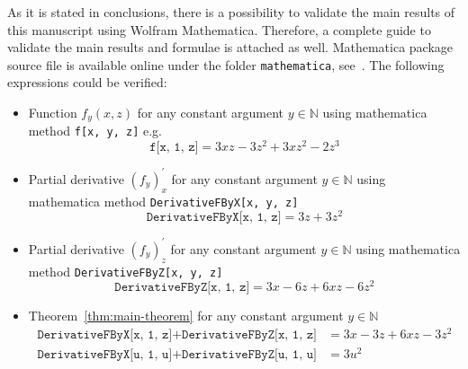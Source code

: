 As it is stated in conclusions, there is a possibility to validate the main results of this manuscript using
Wolfram Mathematica.
Therefore, a complete guide to validate the main results and formulae is attached as well.
Mathematica package source file is available online under the folder \texttt{mathematica}, see~\cite{kolosov2022another}.
The following expressions could be verified:
\begin{itemize}
    \item Function $f_y(x,z)$ for any constant argument $y\in\mathbb{N}$ using mathematica method \texttt{f[x, y, z]} e.g.
    \[
        \texttt{f[x, 1, z]} = 3 x z - 3 z^2 + 3 x z^2 - 2 z^3
    \]
    \item Partial derivative $(f_y)^{'}_x$ for any constant argument $y\in\mathbb{N}$ using mathematica
    method \texttt{DerivativeFByX[x, y, z]}
    \[
        \texttt{DerivativeFByX[x, 1, z]} = 3 z + 3 z^2
    \]
    \item Partial derivative $(f_y)^{'}_z$ for any constant argument $y\in\mathbb{N}$ using mathematica
    method \texttt{DerivativeFByZ[x, y, z]}
    \[
        \texttt{DerivativeFByZ[x, 1, z]} = 3 x - 6 z + 6 x z - 6 z^2
    \]
    \item Theorem~\ref{thm:main-theorem} for any constant argument $y\in\mathbb{N}$
    \begin{align*}
        \texttt{DerivativeFByX[x, 1, z]} + \texttt{DerivativeFByZ[x, 1, z]} &= 3 x - 3 z + 6 x z - 3 z^2 \\
        \texttt{DerivativeFByX[u, 1, u]} + \texttt{DerivativeFByZ[u, 1, u]} &= 3 u^2
    \end{align*}
\end{itemize}